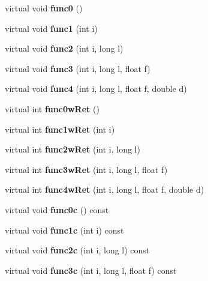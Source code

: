 \begin{DoxyCompactItemize}
\item 
virtual void {\bfseries func0} ()\label{classY_a60ddb343ae08668c5703b00811a15a45}

\item 
virtual void {\bfseries func1} (int i)\label{classY_ae870ca3084fb17974286994c8d9d3c15}

\item 
virtual void {\bfseries func2} (int i, long l)\label{classY_a9aa5f1bbe851f147c52fb3d0d246eb4f}

\item 
virtual void {\bfseries func3} (int i, long l, float f)\label{classY_a073b5f973e1f9d479bfdc57f801e39c2}

\item 
virtual void {\bfseries func4} (int i, long l, float f, double d)\label{classY_aeaac9bfc2069ba95d7321e26c5e88204}

\item 
virtual int {\bfseries func0w\+Ret} ()\label{classY_a021999411ec69de5ee55816604097860}

\item 
virtual int {\bfseries func1w\+Ret} (int i)\label{classY_af301d0c580eed67581a62719cb4a5ffb}

\item 
virtual int {\bfseries func2w\+Ret} (int i, long l)\label{classY_a93f0a58af156905f884f894e4295a4a6}

\item 
virtual int {\bfseries func3w\+Ret} (int i, long l, float f)\label{classY_a6f233f97f017f896dc883f35f4018d94}

\item 
virtual int {\bfseries func4w\+Ret} (int i, long l, float f, double d)\label{classY_afb53d3dbeabfc317b46093b9128b5c80}

\item 
virtual void {\bfseries func0c} () const \label{classY_a53dc0e8b3d6d7a242efba17cf1bd04f5}

\item 
virtual void {\bfseries func1c} (int i) const \label{classY_ab06f476af0ed86c89f663e591ac27a00}

\item 
virtual void {\bfseries func2c} (int i, long l) const \label{classY_a3d401cc5982a79fd0cfe75d5e3b9738c}

\item 
virtual void {\bfseries func3c} (int i, long l, float f) const \label{classY_ab869c005557d74b6157cc539f40e316f}


\end{DoxyCompactItemize}
